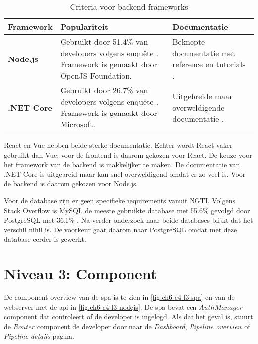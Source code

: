 \begin{table}[hbt!]
  \centering
  \caption{Criteria voor backend frameworks}
  \vspace*{.5\baselineskip}
  \begin{tabular}{|p{.15\linewidth}|p{.4\linewidth}|p{.4\linewidth}|}
  \hline
  \textbf{Framework} & \textbf{Populariteit} & \textbf{Documentatie} \\ \hline
    \textbf{Node.js} &
    Gebruikt door 51.4\% van developers volgens enquête \cite{stack-overflow-survey-2020-popular-framework-libraries-tools}. Framework is \newline gemaakt door OpenJS Foundation. &
    Beknopte documentatie met reference en tutorials \cite{nodejs-docs}.
    \\ \hline

    \textbf{.NET Core} &
    Gebruikt door 26.7\% van developers volgens enquête \cite{stack-overflow-survey-2020-popular-framework-libraries-tools}. Framework is \newline gemaakt door Microsoft. &
    Uitgebreide maar overweldigende \newline documentatie \cite{dotnet-core-docs}.
    \\ \hline
  \end{tabular}
  \label{table:ch6-criteria-compared-against-backend-frameworks}
\end{table}

React en Vue hebben beide sterke documentatie. Echter wordt React vaker gebruikt dan Vue; voor de frontend is daarom gekozen voor React. De keuze voor het framework van de backend is makkelijker te maken. De documentatie van .NET Core is uitgebreid maar kan snel overweldigend omdat er zo veel is. Voor de backend is daarom gekozen voor Node.js.

Voor de database zijn er geen specifieke requirements vanuit NGTI. Volgens Stack Overflow is MySQL de meeste gebruikte database met 55.6\% gevolgd door PostgreSQL met 36.1\% \cite{stack-overflow-survey-2020-technology-databases}. Na verder onderzoek naar beide databases blijkt dat het verschil nihil is. De voorkeur gaat daarom naar PostgreSQL omdat met deze database eerder is gewerkt.

\section{Niveau 3: Component}\label{sec:ch6-niveau-3-component}
De component overview van de \acrshort{spa} is te zien in \autoref{fig:ch6-c4-l3-spa} en van de webserver met de \acrshort{api} in \autoref{fig:ch6-c4-l3-nodejs}. De \acrshort{spa} bevat een \(AuthManager\) component dat controleert of de developer is ingelogd. Als dat het geval is, stuurt de \(Router\) component de developer door naar de \textit{Dashboard}, \textit{Pipeline overview} of \textit{Pipeline details} pagina.

